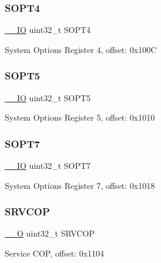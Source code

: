 \subsubsection{\texorpdfstring{SOPT4}{SOPT4}}
{\footnotesize\ttfamily \mbox{\hyperlink{core__cm0plus_8h_aec43007d9998a0a0e01faede4133d6be}{\+\_\+\+\_\+\+IO}} uint32\+\_\+t S\+O\+P\+T4}

System Options Register 4, offset\+: 0x100C \mbox{\label{struct_s_i_m___type_ad3423d05c1b61a09639d9ea8b5d3ea66}} 
\subsubsection{\texorpdfstring{SOPT5}{SOPT5}}
{\footnotesize\ttfamily \mbox{\hyperlink{core__cm0plus_8h_aec43007d9998a0a0e01faede4133d6be}{\+\_\+\+\_\+\+IO}} uint32\+\_\+t S\+O\+P\+T5}

System Options Register 5, offset\+: 0x1010 \mbox{\label{struct_s_i_m___type_a9a5cff1a3ad3808a7b9478791a37915d}} 
\subsubsection{\texorpdfstring{SOPT7}{SOPT7}}
{\footnotesize\ttfamily \mbox{\hyperlink{core__cm0plus_8h_aec43007d9998a0a0e01faede4133d6be}{\+\_\+\+\_\+\+IO}} uint32\+\_\+t S\+O\+P\+T7}

System Options Register 7, offset\+: 0x1018 \mbox{\label{struct_s_i_m___type_a57790bed2fb6759181812845dbca3eb8}} 
\subsubsection{\texorpdfstring{SRVCOP}{SRVCOP}}
{\footnotesize\ttfamily \mbox{\hyperlink{core__cm0plus_8h_a7e25d9380f9ef903923964322e71f2f6}{\+\_\+\+\_\+O}} uint32\+\_\+t S\+R\+V\+C\+OP}

Service C\+OP, offset\+: 0x1104 \mbox{\label{struct_s_i_m___type_aac796478e9fdd908d4bccc7b754de080}} 
